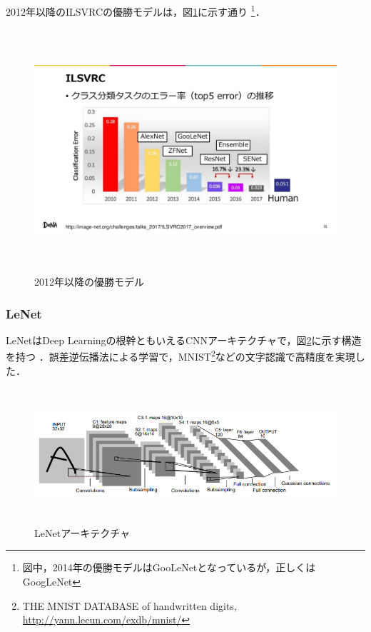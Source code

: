 \documentclass[11pt,a4paper]{jsarticle}
\begin{document}
2012年以降のILSVRCの優勝モデルは，図\ref{ilsvrc_winner_2010-2017_with_algo}に示す通り \cite{dl_hist5} \footnote{図中，2014年の優勝モデルはGooLeNetとなっているが，正しくはGoogLeNet}．

\begin{figure} [H]
	\begin{center}
		\includegraphics[clip, height=9cm, bb=-200 0 1920 1080]{data/figure/ilsvrc_winner_2010-2017_with_algo.png}
		\caption{2012年以降の優勝モデル}
		\label{ilsvrc_winner_2010-2017_with_algo}
	\end{center}
\end{figure}

\subsubsection{LeNet}

LeNetはDeep Learningの根幹ともいえるCNNアーキテクチャで，図\ref{arch_lenet}に示す構造を持つ \cite{arxiv_lenet} \cite{arch_lenet}．誤差逆伝播法による学習で，MNIST\footnote{THE MNIST DATABASE of handwritten digits, \url{http://yann.lecun.com/exdb/mnist/}}などの文字認識で高精度を実現した．

\begin{figure} [H]
	\begin{center}
		\includegraphics[clip, height=5cm, bb=-30 0 711 200]{data/figure/arch_lenet.png}
		\caption{LeNetアーキテクチャ}
		\label{arch_lenet}
	\end{center}
\end{figure}
\end{document}
